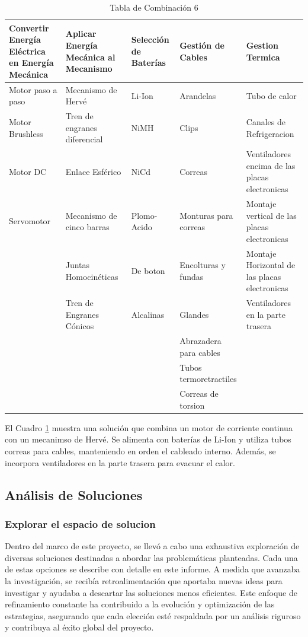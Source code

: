     \begin{table}[H]
    \centering
    \begin{tabularx}{\textwidth}{|X|X|X|X|X|}
    \hline
    \textbf{Convertir Energía Eléctrica en Energía Mecánica} & \textbf{Aplicar Energía Mecánica al Mecanismo} & \textbf{Selección de Baterías} & \textbf{Gestión de Cables} & \textbf{Gestion Termica} \\
    \hline
    Motor paso a paso & \cellcolor{green}Mecanismo de Hervé & \cellcolor{green}Li-Ion  & Arandelas & Tubo de calor\\
    \hline
    Motor Brushless & Tren de engranes diferencial & NiMH & Clips & Canales de Refrigeracion \\
    \hline
    \cellcolor{green}Motor DC & Enlace Esférico & NiCd & \cellcolor{green}Correas & Ventiladores encima de las placas electronicas\\
    \hline
    Servomotor & Mecanismo de cinco barras & Plomo-Acido & Monturas para correas & Montaje vertical de las placas electronicas\\
    \hline
     & Juntas Homocinéticas & De boton & Encolturas y fundas & Montaje Horizontal de las placas electronicas\\
    \hline
     & Tren de Engranes Cónicos & Alcalinas & Glandes & \cellcolor{green}Ventiladores en la parte trasera\\
    \hline
     & & & Abrazadera para cables & \\
    \hline
     & & & Tubos termoretractiles & \\
    \hline
     & & & Correas de torsion & \\
    \hline
    \end{tabularx}
    \caption{Tabla de Combinación 6}
    \label{tab:combinacion_6}
    \end{table} 

    El Cuadro \ref{tab:combinacion_6} muestra una solución que combina un motor de corriente continua con un mecanimso de Hervé. Se alimenta con baterías de Li-Ion y utiliza tubos correas para cables, manteniendo en orden el cableado interno. Además, se incorpora ventiladores en la parte trasera para evacuar el calor.

\needspace{3cm}
\subsection{Análisis de Soluciones}
\subsubsection{Explorar el espacio de solucion}
    Dentro del marco de este proyecto, se llevó a cabo una exhaustiva exploración de diversas soluciones destinadas a abordar las problemáticas planteadas. Cada una de estas opciones se describe con detalle en este informe. A medida que avanzaba la investigación, se recibía retroalimentación que aportaba nuevas ideas para investigar y ayudaba a descartar las soluciones menos eficientes. Este enfoque de refinamiento constante ha contribuido a la evolución y optimización de las estrategias, asegurando que cada elección esté respaldada por un análisis riguroso y contribuya al éxito global del proyecto.
